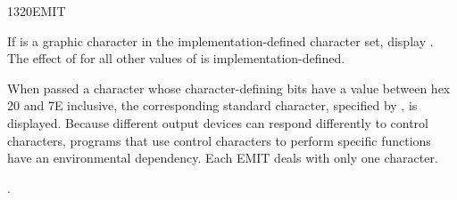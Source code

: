\begin{worddef}{1320}{EMIT}
\item {}

	If  is a graphic character in the implementation-defined
	character set, display . The effect of  for all
	other values of  is implementation-defined.

	When passed a character whose character-defining bits have a
	value between hex 20 and 7E inclusive, the corresponding
	standard character, specified by , is displayed. Because different output
	devices can respond differently to control characters, programs
	that use control characters to perform specific functions have
	an environmental dependency. Each EMIT deals with only one
	character.

\see {}.


\end{worddef}
